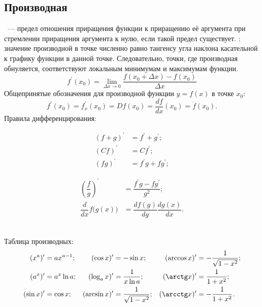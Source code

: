 \subsection{Производная}
~--- предел отношения приращения функции к приращению её аргумента при стремлении приращения аргумента к нулю, если такой предел существует. : значение производной в точке численно равно тангенсу угла наклона касательной к графику функции в данной точке. Следовательно, точки, где производная обнуляется, соответствуют локальным минимумам и максимумам функции.
\begin{equation}
	f^\prime(x_0) = \lim_{\Delta x \to 0}\frac{f(x_0 + \Delta x) - f(x_0)}{\Delta x}
\end{equation}
Общепринятые обозначения для производной функции $y = f(x)$ в точке $x_0$:
\begin{equation}
	f^\prime(x_0) = f^\prime_x(x_0) = D f(x_0) = \frac{d f}{d x}(x_0) = \dot{f} (x_0).
\end{equation}
Правила дифференцирования:\\[-0.5pc]
\begin{minipage}{0.5\textwidth}
	\begin{align*}
		(f+g)^\prime &= f^\prime + g^\prime;\\
		(Cf)^\prime &= Cf^\prime;\\
		(fg)^\prime &= f^\prime g + f g^\prime;
	\end{align*}
\end{minipage}
\begin{minipage}{0.5\textwidth}
	\begin{align*}
		\left(\dfrac{f}{g}\right)^\prime &= \dfrac{f^\prime g - f g^\prime}{g^2};\\
		\dfrac{d}{dx}f\bigl(g(x)\bigr) &= \dfrac{df(g)}{dg}\dfrac{dg(x)}{dx}.
	\end{align*}
\end{minipage}\\[0.5pc]
Таблица производных:
\begin{align*}
	(x^a)^\prime &= a x^{a-1};
	& (\cos x)^\prime &= - \sin x;
	& (\arccos x)^\prime &= - \dfrac{1}{\sqrt{1 - x^2}};\\
	(a^x)^\prime &= a^x \ln a;
	& (\log_a x)^\prime &= \dfrac{1}{x \ln a};
	& (\arctg x)^\prime &= \dfrac{1}{1 + x^2};\\
	(\sin x)^\prime &= \cos x;
	& (\arcsin x)^\prime &=
	\dfrac{1}{\sqrt{1 - x^2}};
	&  (\arcctg x)^\prime &= - \dfrac{1}{1 + x^2}.
\end{align*}
